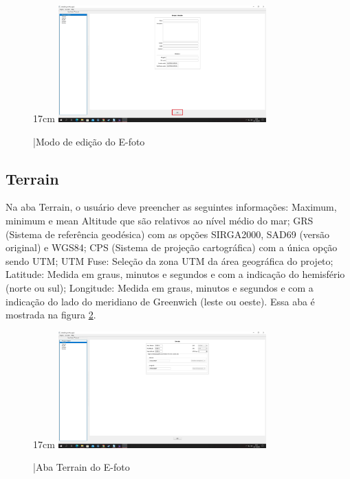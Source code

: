 \begin{figure}[!ht]{17cm}
	\centering
	\includegraphics[width=8cm]{Figuras/efoto2.jpg}
	\caption{|Modo de edição do E-foto} \label{fig:efoto2}
\end{figure}

\subsection{Terrain}
Na aba Terrain, o usuário deve preencher as seguintes informações: Maximum, minimum e mean Altitude que são relativos ao nível médio do mar; GRS (Sistema de referência geodésica) com as opções SIRGA2000, SAD69 (versão original) e WGS84; CPS (Sistema de projeção cartográfica) com a única opção sendo UTM; UTM Fuse: Seleção da zona UTM da área geográfica do projeto; Latitude: Medida em graus, minutos e segundos e com a indicação do hemisfério (norte ou sul); Longitude: Medida em graus, minutos e segundos e com a indicação do lado do meridiano de Greenwich (leste ou oeste). Essa aba é mostrada na figura \ref{fig:terrain}.

\begin{figure}[!ht]{17cm}
	\centering
	\includegraphics[width=8cm]{Figuras/terrain.jpg}
	\caption{|Aba Terrain do E-foto} \label{fig:terrain}
\end{figure}

